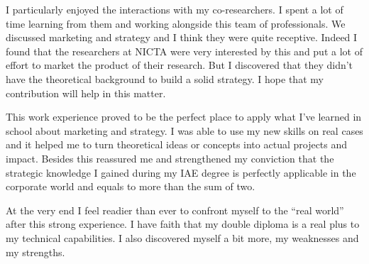 \documentclass[10pt]{report}
\begin{document}
I particularly enjoyed the interactions with my co-researchers. I spent a lot of time learning from them and working alongside this team of professionals. We discussed marketing and strategy and I think they were quite receptive. Indeed I found that the researchers at NICTA were very interested by this and put a lot of effort to market the product of their research. But I discovered that they didn't have the theoretical background to build a solid strategy. I hope that my contribution will help in this matter.

This work experience proved to be the perfect place to apply what I've learned in school about marketing and strategy. I was able to use my new skills on real cases and it helped me to turn theoretical ideas or concepts into actual projects and impact. Besides this reassured me and strengthened my conviction that the strategic knowledge I gained during my IAE degree is perfectly applicable in the corporate world and equals to more than the sum of two.

At the very end I feel readier than ever to confront myself to the \enquote{real world} after this strong experience. I have faith that my double diploma is a real plus to my technical capabilities. I also discovered myself a bit more, my weaknesses and my strengths. 



\newpage


\newpage

\pagestyle{plain}

\nocite{*}
\setlength{\bibitemsep}{5pt}

\printbibliography[title={Technological references},keyword={tech}, heading=subbibliography]
\printbibliography[title={Strategic references},keyword={strat}, heading=subbibliography]

\printbibliography[title={Other references}, notkeyword={tech}, notkeyword={strat}, heading=subbibliography]
\end{document}
